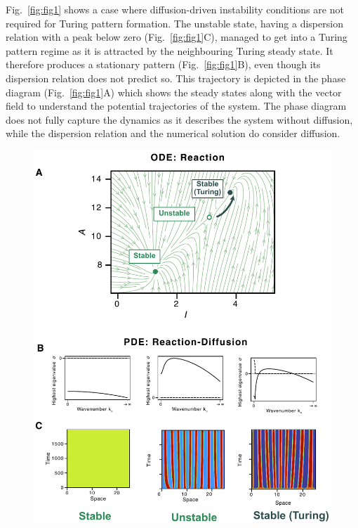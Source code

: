 \documentclass[10pt,letterpaper]{article}
\begin{document}
Fig.~\ref{fig:fig1} shows a case where diffusion-driven instability conditions are not required for Turing pattern formation.
The unstable state, having a dispersion relation with a peak below zero (Fig.~\ref{fig:fig1}C), managed to get into a Turing pattern regime as it is attracted by the neighbouring Turing steady state.
It therefore produces a stationary pattern (Fig.~\ref{fig:fig1}B), even though its dispersion relation does not predict so.
This trajectory is depicted in the phase diagram (Fig.~\ref{fig:fig1}A) which shows the steady states along with the vector field to understand the potential trajectories of the system.
The phase diagram does not fully capture the dynamics as it describes the system without diffusion, while the dispersion relation and the numerical solution do consider diffusion.

\begin{figure}[!h]
    \includegraphics[width=1\textwidth]{figures/multistability1}


\end{figure}
\end{document}
